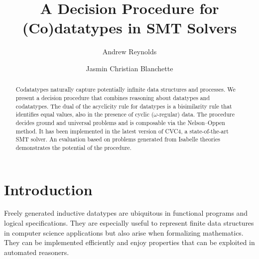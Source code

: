 \makeatletter
\ps@myheadings
\makeatother







\title{A Decision Procedure for (Co)datatypes in SMT Solvers}

\author {Andrew Reynolds \and Jasmin Christian Blanchette}

\maketitle

\begin{abstract}
Codatatypes naturally capture potentially infinite data structures and
processes. We present a decision procedure that combines reasoning about
datatypes and codatatypes. The dual of the acyclicity rule for datatypes is a
bisimilarity rule that identifies equal values, also in the presence of cyclic
($\omega$-regular) data. The procedure decides ground and universal
problems and is composable via the Nelson--Oppen method. It has been
implemented in the latest version of CVC4, a state-of-the-art SMT solver. An
evaluation based on problems generated from Isabelle theories demonstrates the
potential of the procedure.
\end{abstract}

\setcounter{footnote}{0}

\section{Introduction}
\label{sec:introduction}

Freely generated inductive datatypes are ubiquitous in functional programs and
logical specifications. They are especially
useful to represent finite data structures in computer science applications but
also arise when formalizing mathematics.
They can be implemented efficiently and enjoy
properties that can be exploited in automated reasoners. 
%

